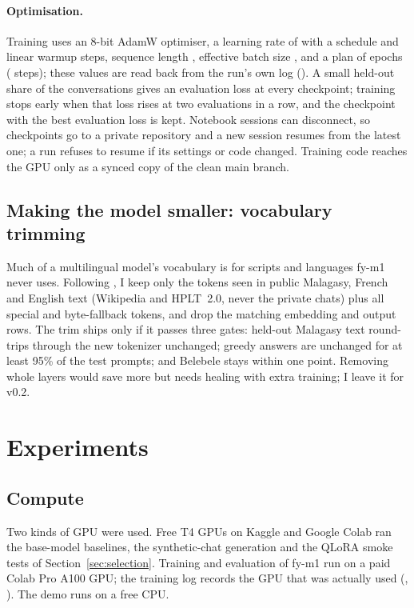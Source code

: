 \documentclass[11pt]{article}
\begin{document}
\paragraph{Optimisation.} Training uses an 8-bit AdamW optimiser, a learning rate of \fyLearningRate{}
with a \fyLrScheduler{} schedule and \fyWarmupSteps{} linear warmup steps, sequence length
\fyMaxSeqLen{}, effective batch size \fyEffectiveBatch{}, and a plan of \fyTrainEpochs{} epochs
(\fyTrainPlannedSteps{} steps); these values are read back from the run's own log
(). A small held-out share of the
conversations gives an evaluation loss at every checkpoint; training stops early when that loss rises at
two evaluations in a row, and the checkpoint with the best evaluation loss is kept. Notebook sessions can
disconnect, so checkpoints go to a private repository and a new session resumes from the latest one; a
run refuses to resume if its settings or code changed. Training code reaches the GPU only as a synced
copy of the clean main branch.

\subsection{Making the model smaller: vocabulary trimming}
\label{sec:trim}
Much of a multilingual model's vocabulary is for scripts and languages fy-m1 never uses. Following
\citet{ushio-etal-2023-efficient}, I keep only the tokens seen in public Malagasy, French and English
text (Wikipedia and HPLT~2.0, never the private chats) plus all special and byte-fallback tokens, and drop
the matching embedding and output rows. The trim ships only if it passes three gates: held-out Malagasy
text round-trips through the new tokenizer unchanged; greedy answers are unchanged for at least 95\% of the
test prompts; and Belebele stays within one point. Removing whole layers \citep{gromov2024deeper} would
save more but needs healing with extra training; I leave it for v0.2.

\section{Experiments}
\label{sec:experiments}
\subsection{Compute}
\label{sec:compute}
Two kinds of GPU were used. Free T4 GPUs on Kaggle and Google Colab ran the base-model baselines, the
synthetic-chat generation and the QLoRA smoke tests of Section~\ref{sec:selection}. Training and
evaluation of fy-m1 run on a paid Colab Pro A100 GPU; the training log records the GPU that was actually
used (\fyTrainGpu{}, ). The demo runs on a free CPU.
\end{document}
